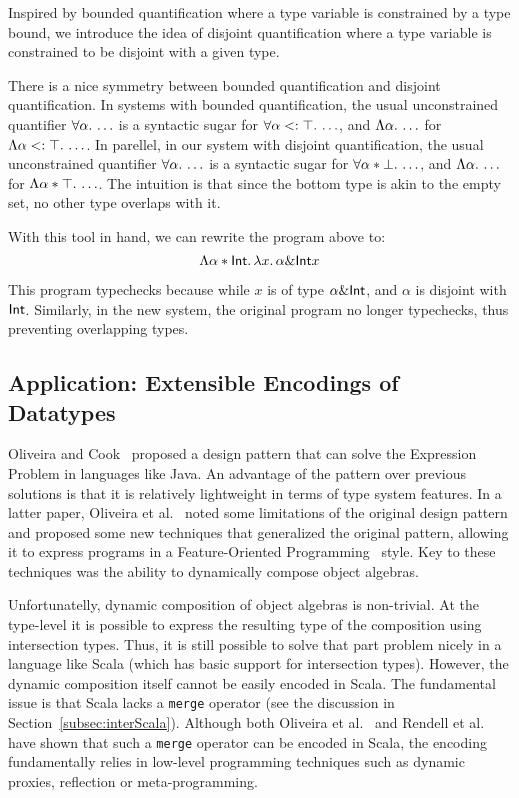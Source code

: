 Inspired by bounded quantification where a type variable is constrained by a type bound,
we introduce the idea of disjoint quantification where a type variable is constrained
to be disjoint with a given type.

There is a nice symmetry between bounded quantification and disjoint quantification.
In systems with bounded quantification,
the usual unconstrained quantifier $\forall \alpha.\, \ldots$
is a syntactic sugar for $\forall \alpha <: \top.\, \ldots$, and
$\Lambda \alpha.\, \ldots$ for $\Lambda \alpha <: \top.\, \ldots$.
In parellel, in our system with disjoint quantification,
the usual unconstrained quantifier $\forall \alpha.\, \ldots$
is a syntactic sugar for $\forall \alpha * \bot.\, \ldots$, and
$\Lambda \alpha.\, \ldots$ for $\Lambda \alpha * \top.\, \ldots$.
The intuition is that since the bottom type is akin to the empty set,
no other type overlaps with it.

With this tool in hand, we can rewrite the program above to:
\[
\Lambda \alpha * \textsf{Int}.\, \lambda x.\, \alpha \& \textsf{Int} x
\]

This program typechecks because while $x$ is of type $\alpha \& \textsf{Int}$,
and $\alpha$ is disjoint with $\textsf{Int}$. Similarly, in the new system,
the original program no longer typechecks, thus preventing overlapping types.

\subsection{Application: Extensible Encodings of Datatypes}
\label{subsec:OAs}

Oliveira and Cook~\cite{oliveira2012extensibility} proposed a design pattern that can solve the
Expression Problem in languages like Java. An advantage of the pattern
over previous solutions is that it is relatively lightweight in terms
of type system features. In a latter paper, Oliveira et al.~\cite{oliveira2013feature}
noted some limitations of the original design pattern and proposed 
some new techniques that generalized the original pattern, allowing it 
to express programs in a Feature-Oriented Programming~\cite{Prehofer97} style.
Key to these techniques was the ability to dynamically compose object
algebras.

Unfortunatelly, dynamic composition of object algebras is
non-trivial. At the type-level it is possible to express the resulting
type of the composition using intersection types. Thus, it is still
possible to solve that part problem nicely in a language like Scala (which
has basic support for intersection types). However, the dynamic
composition itself cannot be easily encoded in Scala. The fundamental 
issue is that Scala lacks a \lstinline{merge} operator (see the
discussion in Section~\ref{subsec:interScala}). Although both Oliveira et al.~\cite{oliveira2013feature} and
Rendell et al.~\cite{rendel14attributes} have shown that such a \lstinline{merge} operator can
be encoded in Scala, the encoding fundamentally relies in low-level
programming techniques such as dynamic proxies, reflection or
meta-programming. 

